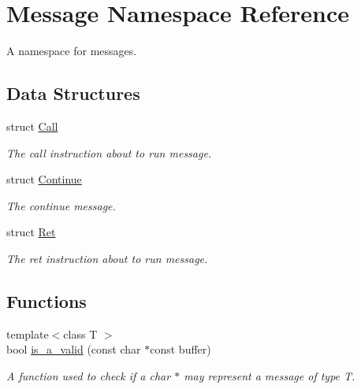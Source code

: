 \hypertarget{namespace_message}{}\section{Message Namespace Reference}
\label{namespace_message}


A namespace for messages.  


\subsection*{Data Structures}
\begin{DoxyCompactItemize}
\item 
struct \hyperlink{struct_message_1_1_call}{Call}
\begin{DoxyCompactList}\small\item\em The \textquotesingle{}call instruction about to run\textquotesingle{} message. \end{DoxyCompactList}\item 
struct \hyperlink{struct_message_1_1_continue}{Continue}
\begin{DoxyCompactList}\small\item\em The \textquotesingle{}continue\textquotesingle{} message. \end{DoxyCompactList}\item 
struct \hyperlink{struct_message_1_1_ret}{Ret}
\begin{DoxyCompactList}\small\item\em The \textquotesingle{}ret instruction about to run\textquotesingle{} message. \end{DoxyCompactList}\end{DoxyCompactItemize}
\subsection*{Functions}
\begin{DoxyCompactItemize}
\item 
{\footnotesize template$<$class T $>$ }\\bool \hyperlink{namespace_message_a08d82d21aa4077ca6657a140fe8ff693}{is\+\_\+a\+\_\+valid} (const char $\ast$const buffer)
\begin{DoxyCompactList}\small\item\em A function used to check if a char $\ast$ may represent a message of type T. \end{DoxyCompactList}\end{DoxyCompactItemize}


